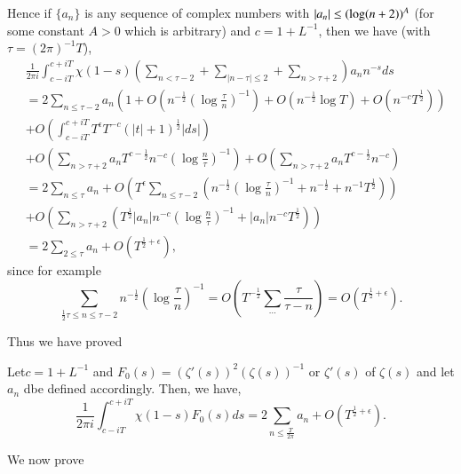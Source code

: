 Hence if $\{a_{n}\}$ is any sequence of complex numbers with
$|a_{n}|\leq\break(\log (n+2))^{A}$ (for some constant $A>0$ which is
arbitrary) and $c=1+L^{-1}$, then we have (with $\tau=(2\pi)^{-1}T$), 
\begin{align*}
& \frac{1}{2\pi
    i}\int^{c+iT}_{c-iT}\chi(1-s)\left(\sum_{n<\tau-2}+\sum_{|n-\tau|\leq
    2}+\sum_{n>\tau+2}\right)a_{n}n^{-s}ds\\
&=2\sum_{n\leq
\tau-2}a_{n}\left(1+O\left(n^{-\frac{1}{2}}\left(\log\frac{\tau}{n}\right)^{-1}\right)+O\left(n^{-\frac{1}{2}}\log
  T\right)+O\left(n^{-c}T^{\frac{1}{2}}\right)\right)\\ 
&+O\left(\int^{c+iT}_{c-iT}T^{\epsilon}T^{-c}(|t|+1)^{\frac{1}{2}}|ds|\right)\\
&+O\left(\sum_{n>\tau+2}a_{n}T^{c-\frac{1}{2}}n^{-c} \left(\log\frac{n}{\tau} \right)^{-1}\right)+O\left(\sum_{n>\tau+2}a_{n}T^{c-\frac{1}{2}}n^{-c}\right)\\
&=2\sum_{n\leq \tau}a_{n}+O\left(T^{\epsilon}\sum_{n\leq
    \tau-2}\left(n^{-\frac{1}{2}}\left(\log\frac{\tau}{n}\right)^{-1}+n^{-\frac{1}{2}}+n^{-1}T^{\frac{1}{2}}\right)\right)\\
&+O\left(\sum_{n>\tau+2}\left(T^{\frac{1}{2}}|a_{n}|n^{-c}\left(\log
  \frac{n}{\tau}\right)^{-1}+|a_{n}|n^{-c}T^{\frac{1}{2}}\right)\right)\\
&=2\sum_{2\leq \tau}a_{n}+O(T^{\frac{1}{2}+\epsilon}),
\end{align*}
since for example
$$
\sum_{\frac{1}{2}\tau\leq n\leq \tau-2}n^{-\frac{1}{2}}\left(\log
\frac{\tau}{n}\right)^{-1}=O\left(T^{-\frac{1}{2}}\sum\limits_{\cdots}\frac{\tau}{\tau-n}\right)=O(T^{\frac{1}{2}+\epsilon}). 
$$

Thus we have proved 

\begin{lem}\label{c5:sec1.4-lem2}
Let\pageoriginale $c=1+L^{-1}$ and $F_{0}(s)=(\zeta'(s))^{2}(\zeta(s))^{-1}$ or
$\zeta'(s)$ of $\zeta(s)$ and let $a_{n}$ dbe defined
accordingly. Then, we have,
\begin{equation*}
\frac{1}{2\pi i}\int^{c+iT}_{c-iT}\chi(1-s)F_{0}(s)ds=2\sum_{n\leq \frac{T}{2\pi}}a_{n}+O(T^{\frac{1}{2}+\epsilon}).\tag{5.4.12}\label{c5:eq5.4.12}
\end{equation*}
\end{lem}

We now prove

